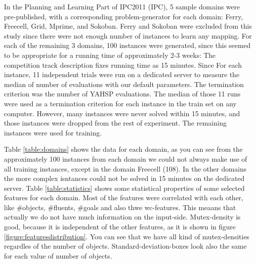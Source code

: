 \documentclass[letterpaper]{article}
\begin{document}
In the Planning and Learning Part of IPC2011 (IPC), 5 sample domains were pre-published, with a corresponding problem-generator for each domain: Ferry, Freecell, Grid, Mprime, and Sokoban. Ferry and Sokoban were excluded from this study since there were not enough number of instances to learn any mapping. For each of the remaining 3 domains, 100 instances were generated, since this seemed to be appropriate for a running time of approximately 2-3 weeks: The competition track description fixes running time as 15 minutes. Since For each instance, 11 independent trials were run on a dedicated server to measure the median of number of evaluations with our default parameters. The termination criterion was the number of YAHSP evaluations. The median of those 11 runs were used as a termination criterion for each instance in the train set on any computer. However, many instances were never solved within 15 minutes, and those instances were dropped from the rest of experiment. The remaining instances were used for training.

Table \ref{table:domains} shows the data for each domain, as you can see from the approximately 100 instances from each domain we could not always make use of all training instances, except in the domain Freecell (108). In the other domains the more complex isntances could not be solved in 15 minutes on the dedicated server. Table \ref{table:statistics} shows some statistical properties of some selected features for each domain. Most of the features were correlated with each other, like \#objects, \#fluents, \#goals and also thwe wc-features. This meaans that actually we do not have much information on the input-side. Mutex-density is good, because it is independent of the other features, as it is shown in figure \ref{figure:featuresdistribution}. You can see that we have all kind of mutex-densities regardles of the number of objects. Standard-deviation-boxes look also the same for each value of number of objects.
\end{document}
